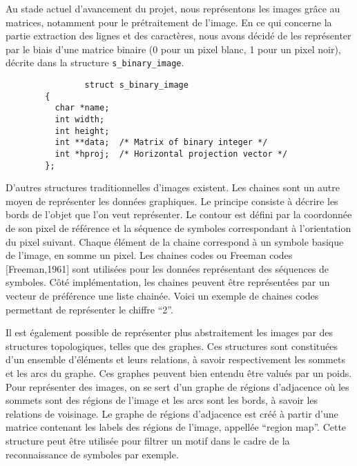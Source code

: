 \documentclass[]{report}
\begin{document}

      Au stade actuel d'avancement du projet, nous représentons les images grâce au matrices, notamment pour le prétraitement de l'image. En ce qui concerne la partie extraction des lignes et des caractères, nous avons décidé de les représenter par le biais d'une matrice binaire (0 pour un pixel blanc, 1 pour un pixel noir), décrite dans la structure \verb!s_binary_image!.

      \begin{verbatim}
				struct s_binary_image
        {
          char *name;
          int width;
          int height;
          int **data;  /* Matrix of binary integer */
          int *hproj;  /* Horizontal projection vector */
        };
			\end{verbatim}

      D'autres structures traditionnelles d'images existent. Les chaines sont un autre moyen de représenter les données graphiques. Le principe consiste à décrire les bords de l'objet que l'on veut représenter. Le contour est défini par la coordonnée de son pixel de référence et la séquence de symboles correspondant à l'orientation du pixel suivant. Chaque élément de la chaine correspond à un symbole basique de l'image, en somme un pixel. Les chaines codes ou Freeman codes [Freeman,1961] sont utilisées pour les données représentant des séquences de symboles. Côté implémentation, les chaines peuvent être représentées par un vecteur de préférence une liste chainée. Voici un exemple de chaines codes permettant de représenter le chiffre ``2''.




      Il est également possible de représenter plus abstraitement les images par des structures topologiques, telles que des graphes. Ces structures sont constituées d'un ensemble d'éléments et leurs relations, à savoir respectivement les sommets et les arcs du graphe. Ces graphes peuvent bien entendu être valués par un poids. Pour représenter des images, on se sert d'un graphe de régions d'adjacence où les sommets sont des régions de l'image et les arcs sont les bords, à savoir les relations de voisinage. Le graphe de régions d'adjacence est créé à partir d'une matrice contenant les labels des régions de l'image, appellée ``region map''. Cette structure peut être utilisée pour filtrer un motif dans le cadre de la reconnaissance de symboles par exemple.
\end{document}
